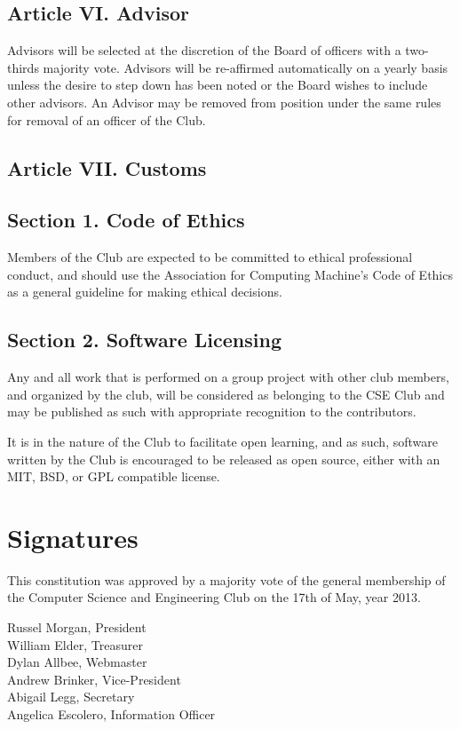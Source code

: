 \documentclass{article}
\begin{document}
  \subsection{Article VI. Advisor}
    Advisors will be selected at the discretion of the Board of officers with a two-thirds majority vote. Advisors will be re-affirmed automatically on a yearly basis unless the desire to step down has been noted or the Board wishes to include other advisors. An Advisor may be removed from position under the same rules for removal of an officer of the Club.

  \subsection{Article VII. Customs}
    \subsection{Section 1. Code of Ethics}
      Members of the Club are expected to be committed to ethical professional conduct, and should use the Association for Computing Machine's Code of Ethics as a general guideline for making ethical decisions.
    \subsection{Section 2. Software Licensing}
      Any and all work that is performed on a group project with other club members, and organized by the club, will be considered as belonging to the CSE Club and may be published as such with appropriate recognition to the contributors.

      It is in the nature of the Club to facilitate open learning, and as such, software written by the Club is encouraged to be released as open source, either with an MIT, BSD, or GPL compatible license.

  \section{Signatures}
    This constitution was approved by a majority vote of the general membership of the Computer Science and Engineering Club on the 17th of May, year 2013.\\[0.4in]

  \begin{multicols}{2}
    Russel Morgan, President\\[0.2in]

    William Elder, Treasurer\\[0.2in]

    Dylan Allbee, Webmaster\\[0.2in]

    Andrew Brinker, Vice-President\\[0.2in]

    Abigail Legg, Secretary\\[0.2in]

    Angelica Escolero, Information Officer\\
  \end{multicols}
\end{document}
